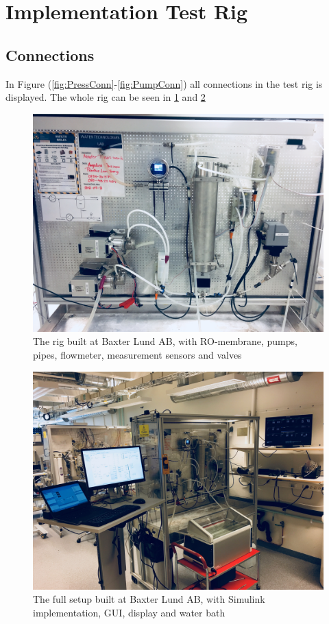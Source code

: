 \section{Implementation Test Rig}
\subsection{Connections}
In Figure (\ref{fig:PressConn}-\ref{fig:PumpConn}) all connections in the test rig is displayed. The whole rig can be seen in \ref{fig:Rig1} and \ref{fig:Rig2}
\begin{figure}[H]
    \centering
    \includegraphics[width=1\textwidth]{Rig1}
    \caption{The rig built at Baxter Lund AB, with RO-membrane, pumps, pipes, flowmeter, measurement sensors and valves}
    \label{fig:Rig1}
\end{figure}
\begin{figure}[H]
    \centering
    \includegraphics[width=1\textwidth]{Rig2}
    \caption{The full setup built at Baxter Lund AB, with Simulink implementation, GUI, display and water bath}
    \label{fig:Rig2}
\end{figure}
